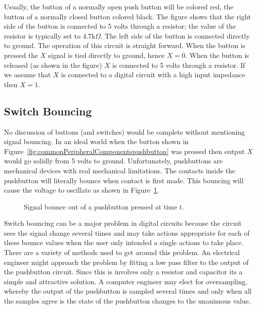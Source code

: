 Usually, the button of a normally open push button will be colored
red, the button of a normally closed button colored black.
The figure shows that the right side of the button is connected to 
5 volts through a resistor; the value of the resistor is typically
set to 4.7k$\Omega$.  The left side of the button is connected directly 
to ground.  The operation of this circuit is straight forward.  When 
the button is pressed the $X$ signal is tied directly to ground,
hence $X=0$.  When the button is released (as shown in the figure) 
$X$ is connected to 5 volts through a resistor.  If we assume that
$X$ is connected to a digital circuit with a high input impedance 
then $X=1$.  

\subsection{Switch Bouncing}
No discussion of buttons (and switches) would be complete without
mentioning signal bouncing.  In an ideal world when the button
shown in Figure~\ref{fig:commonPeripheralComponentspushbutton} was pressed then output $X$
would go solidly from 5 volts to ground.  Unfortunately, pushbuttons
are mechanical devices with real mechanical limitations.  The contacts
inside the pushbutton will literally bounce when contact is first 
made.  This bouncing will cause the voltage to oscillate as shown
in Figure~\ref{fig:commonPeripheralComponentsbounce}.

\begin{figure}[ht]
\caption{Signal bounce out of a pushbutton pressed at time $t$.}
\label{fig:commonPeripheralComponentsbounce}
\end{figure}

Switch bouncing can be a major problem in digital circuits because
the circuit sees the signal change several times and may take 
actions appropriate for each of these bounce values when the user
only intended a single actions to take place.  There are a variety of
methods used to get around this problem.  An electrical engineer
might approach the problem by fitting a low pass filter to the 
output of the pushbutton circuit.  Since this is involves only a
resistor and capacitor its a simple and attractive solution.  A 
computer engineer may elect for oversampling, whereby the output
of the pushbutton is sampled several times and only when all the
samples agree is the state of the pushbutton changes to the 
unanimous value.


